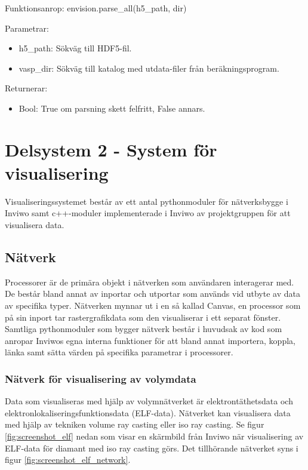 \documentclass[a4paper,12pt]{article}
\begin{document}
Funktionsanrop: envision.parse\_all(h5\_path, dir)

Parametrar:
\begin{itemize}
\setlength\itemsep{0em}
\item h5\_path: Sökväg till HDF5-fil.
\item vasp\_dir: Sökväg till katalog med utdata-filer från beräkningsprogram.
\end{itemize}

Returnerar:
\begin{itemize}
\setlength\itemsep{0em}
\item Bool: True om parsning skett felfritt, False annars.
\end{itemize}

\section{Delsystem 2 - System för visualisering}
Visualiseringssystemet består av ett antal pythonmoduler för nätverksbygge i Inviwo samt c++-moduler implementerade i Inviwo av projektgruppen för att visualisera data.

\subsection{Nätverk}
Processorer är de primära objekt i nätverken som användaren interagerar med. De består bland annat av inportar och utportar som används vid utbyte av data av specifika typer. Nätverken mynnar ut i en så 
kallad Canvas, en processor som på sin inport tar rastergrafikdata som den visualiserar i ett separat fönster. Samtliga pythonmoduler som bygger nätverk består i huvudsak av kod som anropar Inviwos egna interna funktioner för att bland annat importera, koppla, länka samt sätta värden på specifika parametrar i processorer.

\subsubsection{Nätverk för visualisering av volymdata}
\label{ref:visualisering-volymdata}

Data som visualiseras med hjälp av volymnätverket är elektrontäthetsdata och 
elektronlokaliseringsfunktionsdata (ELF-data).
Nätverket kan visualisera 
data med hjälp av tekniken volume ray casting eller iso ray casting. 
Se figur \ref{fig:screenshot_elf} nedan som visar en skärmbild
från Inviwo när visualisering av ELF-data
för diamant
med iso ray casting görs. Det tillhörande nätverket syns i figur \ref{fig:screenshot_elf_network}.
\end{document}
